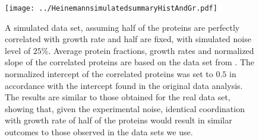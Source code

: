 \documentclass{article}
\begin{document}
\begin{figure}[H]
\begin{center}
\texttt{[image: ../HeinemannsimulatedsummaryHistAndGr.pdf]}
\caption{\label{fig:simulated}
A simulated data set, assuming half of the proteins are perfectly correlated with growth rate and half are fixed, with simulated noise level of $25\%$.
Average protein fractions, growth rates and normalized slope of the correlated proteins are based on the data set from \cite{Schmidt2015}.
The normalized intercept of the correlated proteins was set to $0.5$ in accordance with the intercept found in the original data analysis.
The results are similar to those obtained for the real data set, showing that, given the experimental noise, identical coordination with growth rate of half of the proteins would result in similar outcomes to those observed in the data sets we use.%
}
\end{center}
\end{figure}
\end{document}
